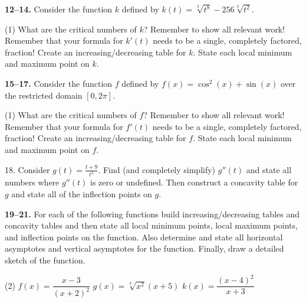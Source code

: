 \documentclass[10pt,oneside,]{book}
\theoremstyle{plain}
\theoremstyle{definition}
\numberwithin{equation}{section}
\newcommand{\fe}[2]{#1\mathopen{}\left(#2\right)\mathclose{}}
\newcommand{\cinterval}[2]{\left[#1,#2\right]}
\newcommand{\fd}[1]{#1'}
\newcommand{\sd}[1]{#1''}
\begin{document}
\textbf{12--14. }\hypertarget{exercisegroup-123}{\null}Consider the function \(k\) defined by \(\fe{k}{t}=\sqrt[3]{t^8}-256\sqrt[3]{t^2}\).%
\par
\begin{exercisegroup}(1)
\exercise[12.]\hypertarget{exercise-637}{\null}What are the critical numbers of \(k\)?  Remember to show all relevant work!  Remember that your formula for \(\fe{\fd{k}}{t}\) needs to be a single, completely factored, fraction!%
\exercise[13.]\hypertarget{exercise-638}{\null}Create an increasing/decreasing table for \(k\).%
\exercise[14.]\hypertarget{exercise-639}{\null}State each local minimum and maximum point on \(k\).%
\end{exercisegroup}
\par\smallskip\noindent
\textbf{15--17. }\hypertarget{exercisegroup-124}{\null}Consider the function \(f\) defined by \(\fe{f}{x}=\fe{\cos^2}{x}+\fe{\sin}{x}\) over the restricted domain \(\cinterval{0}{2\pi}\).%
\par
\begin{exercisegroup}(1)
\exercise[15.]\hypertarget{exercise-640}{\null}What are the critical numbers of \(f\)?  Remember to show all relevant work!  Remember that your formula for \(\fe{\fd{f}}{t}\) needs to be a single, completely factored, fraction!%
\exercise[16.]\hypertarget{exercise-641}{\null}Create an increasing/decreasing table for \(f\).%
\exercise[17.]\hypertarget{exercise-642}{\null}State each local minimum and maximum point on \(f\).%
\end{exercisegroup}
\par\smallskip\noindent
\begin{exerciselist}
\item[18.]\hypertarget{exercise-643}{\null}Consider \(\fe{g}{t}=\frac{t+9}{t^3}\).  Find (and completely simplify) \(\fe{\sd{g}}{t}\) and state all numbers where \(\fe{\sd{g}}{t}\) is zero or undefined.  Then construct a concavity table for \(g\) and state all of the inflection points on \(g\).%
\par\smallskip
\end{exerciselist}
\textbf{19--21. }\hypertarget{exercisegroup-125}{\null}For each of the following functions build increasing/decreasing tables and concavity tables and then state all local minimum points, local maximum points, and inflection points on the function.  Also determine and state all horizontal asymptotes and vertical asymptotes for the function.   Finally, draw a detailed sketch of the function.%
\par
\begin{exercisegroup}(2)
\exercise[19.]\hypertarget{exercise-644}{\null}\(\fe{f}{x}=\dfrac{x-3}{(x+2)^2}\)%
\exercise[20.]\hypertarget{exercise-645}{\null}\(\fe{g}{x}=\sqrt[3]{x^2}(x+5)\)%
\exercise[21.]\hypertarget{exercise-646}{\null}\(\fe{k}{x}=\dfrac{(x-4)^2}{x+3}\)%
\end{exercisegroup}
\par\smallskip\noindent
%
\appendix
%
\typeout{************************************************}
\typeout{************************************************}
\end{document}

